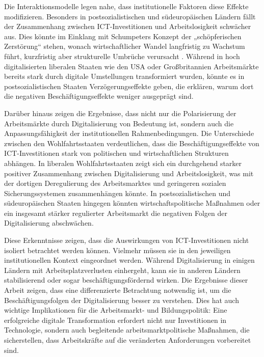 Die Interaktionsmodelle legen nahe, dass institutionelle Faktoren diese Effekte modifizieren. 
Besonders in postsozialistischen und südeuropäischen Ländern fällt der Zusammenhang zwischen 
\ac{ICT}-Investitionen und Arbeitslosigkeit schwächer aus. Dies könnte im Einklang mit 
Schumpeters Konzept der „schöpferischen Zerstörung“ stehen, wonach wirtschaftlicher Wandel 
langfristig zu Wachstum führt, kurzfristig aber strukturelle Umbrüche verursacht 
\parencite[vgl.][S. 81–86]{schumpeter1976capitalism}. Während in hoch digitalisierten liberalen 
Staaten wie den USA oder Großbritannien Arbeitsmärkte bereits stark durch digitale Umstellungen 
transformiert wurden, könnte es in postsozialistischen Staaten Verzögerungseffekte geben, die 
erklären, warum dort die negativen Beschäftigungseffekte weniger ausgeprägt sind.

Darüber hinaus zeigen die Ergebnisse, dass nicht nur die Polarisierung der Arbeitsmärkte durch 
Digitalisierung von Bedeutung ist, sondern auch die Anpassungsfähigkeit der institutionellen 
Rahmenbedingungen. Die Unterschiede zwischen den Wohlfahrtsstaaten verdeutlichen, dass die 
Beschäftigungseffekte von \ac{ICT}-Investitionen stark von politischen und wirtschaftlichen 
Strukturen abhängen. In liberalen Wohlfahrtsstaaten zeigt sich ein durchgehend starker positiver 
Zusammenhang zwischen Digitalisierung und Arbeitslosigkeit, was mit der dortigen Deregulierung 
des Arbeitsmarktes und geringeren sozialen Sicherungssystemen zusammenhängen könnte. In 
postsozialistischen und südeuropäischen Staaten hingegen könnten wirtschaftspolitische Maßnahmen 
oder ein insgesamt stärker regulierter Arbeitsmarkt die negativen Folgen der Digitalisierung 
abschwächen.

Diese Erkenntnisse zeigen, dass die Auswirkungen von \ac{ICT}-Investitionen nicht isoliert 
betrachtet werden können. Vielmehr müssen sie in den jeweiligen institutionellen Kontext 
eingeordnet werden. Während Digitalisierung in einigen Ländern mit Arbeitsplatzverlusten 
einhergeht, kann sie in anderen Ländern stabilisierend oder sogar beschäftigungsfördernd wirken. 
Die Ergebnisse dieser Arbeit zeigen, dass eine differenzierte Betrachtung notwendig ist, um die 
Beschäftigungsfolgen der Digitalisierung besser zu verstehen. Dies hat auch wichtige 
Implikationen für die Arbeitsmarkt- und Bildungspolitik: Eine erfolgreiche digitale 
Transformation erfordert nicht nur Investitionen in Technologie, sondern auch begleitende 
arbeitsmarktpolitische Maßnahmen, die sicherstellen, dass Arbeitskräfte auf die veränderten 
Anforderungen vorbereitet sind.

